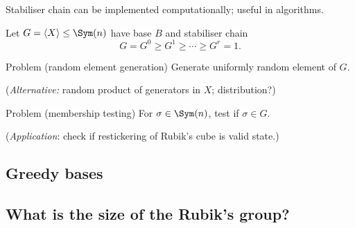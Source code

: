 \begin{slide}
    Stabiliser chain can be implemented computationally; useful in algorithms.

    Let $G = \langle X \rangle \leq \Sym(n)$ have base $B$ and stabiliser chain
    $$G = G^0 \geq G^1 \geq \dotsb \geq G^r = 1.$$

    \begin{alertblock}{Problem (random element generation)}
        \vspace{0pt}
        Generate uniformly random element of $G$.

        (\textit{Alternative:} random product of generators in $X$; distribution?)
    \end{alertblock}

    \begin{alertblock}{Problem (membership testing)}
        \vspace{0pt}
        For $\sigma \in \Sym(n)$, test if $\sigma \in G$.

        (\textit{Application}: check if restickering of Rubik's cube is valid state.)
    \end{alertblock}
\end{slide}

\subsection{Greedy bases}

\begin{slide}




\end{slide}

\subsection{What is the size of the Rubik's group?}

